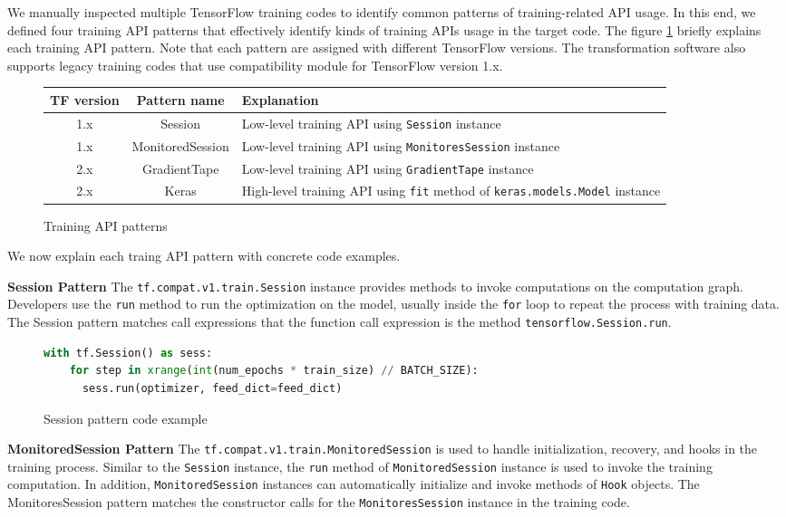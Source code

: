 We manually inspected multiple TensorFlow training codes to identify
common patterns of training-related API usage. 
In this end, we defined four training API patterns
that effectively identify kinds of training APIs usage in the target code.
The figure \ref{tab:patterns} briefly explains each training API pattern.
Note that each pattern are assigned with different TensorFlow versions.
The transformation software also supports legacy training codes
that use compatibility module for TensorFlow version 1.x.

\begin{figure}
  \centering
  \begin{tabular}{|c|c|l|}
    \hline
    TF version & Pattern name & Explanation \\
    \hline
    1.x & Session & Low-level training API using {\tt Session} instance\\
    \hline
    1.x & MonitoredSession & Low-level training API using {\tt MonitoresSession} instance \\
    \hline
    2.x & GradientTape & Low-level training API using {\tt GradientTape} instance\\
    \hline
    2.x & Keras & High-level training API using {\tt fit} method of {\tt keras.models.Model} instance\\
    \hline
  \end{tabular}
  \caption{Training API patterns}
  \label{tab:patterns}
\end{figure}

We now explain each traing API pattern with concrete code examples.

\textbf{Session Pattern} 
The {\tt tf.compat.v1.train.Session} instance provides methods to
invoke computations on the computation graph.
Developers use the {\tt run} method to run the optimization on the model,
usually inside the {\tt for} loop to repeat the process with training data.
The Session pattern matches call expressions that the function
call expression is the method {\tt tensorflow.Session.run}.

\begin{figure}
\begin{lstlisting}[language=Python]
with tf.Session() as sess:
    for step in xrange(int(num_epochs * train_size) // BATCH_SIZE):
      sess.run(optimizer, feed_dict=feed_dict)
\end{lstlisting}
\caption{Session pattern code example}
\end{figure}

\textbf{MonitoredSession Pattern}
The {\tt tf.compat.v1.train.MonitoredSession} is used to handle initialization,
recovery, and hooks in the training process\cite{monitoredsession}.
Similar to the {\tt Session} instance, the {\tt run} method of
{\tt MonitoredSession} instance is used to invoke the training computation.
In addition, {\tt MonitoredSession} instances can automatically
initialize and invoke methods of {\tt Hook} objects.
The MonitoresSession pattern matches the constructor calls for the
{\tt MonitoresSession} instance in the training code.

